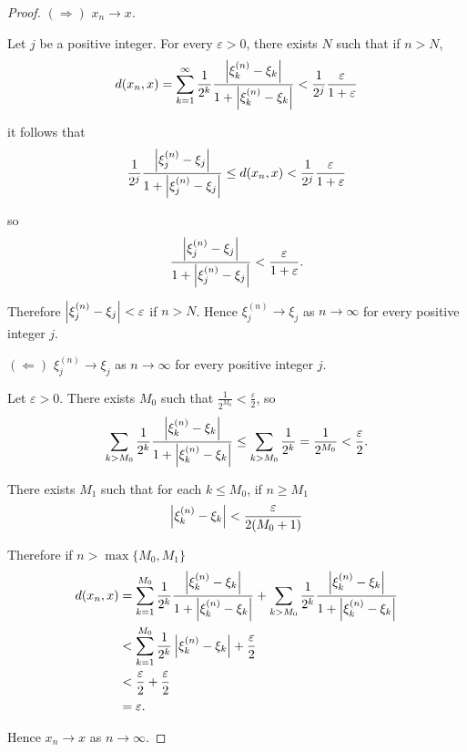 \begin{proof}
    $(\Rightarrow)$ $x_{n}\to x$.

    Let $j$ be a positive integer. For every $\varepsilon > 0$, there exists $N$ such that if $n > N$,
    \[
        d(x_{n}, x) = \sum^{\infty}_{k=1}\frac{1}{2^{k}}\frac{\left\vert{\xi^{(n)}_{k} - \xi_{k}}\right\vert}{1 + \left\vert{\xi^{(n)}_{k} - \xi_{k}}\right\vert} < \frac{1}{2^{j}}\frac{\varepsilon}{1+\varepsilon}
    \]

    it follows that
    \[
        \frac{1}{2^{j}}\frac{\left\vert{\xi^{(n)}_{j} - \xi_{j}}\right\vert}{1 + \left\vert{\xi^{(n)}_{j} - \xi_{j}}\right\vert} \leq d(x_{n}, x) < \frac{1}{2^{j}}\frac{\varepsilon}{1 + \varepsilon}
    \]

    so
    \[
        \frac{\left\vert{\xi^{(n)}_{j} - \xi_{j}}\right\vert}{1 + \left\vert{\xi^{(n)}_{j} - \xi_{j}}\right\vert} < \frac{\varepsilon}{1 + \varepsilon}.
    \]

    Therefore $\left\vert{\xi^{(n)}_{j} - \xi_{j}}\right\vert < \varepsilon$ if $n > N$. Hence $\xi^{(n)}_{j}\to \xi_{j}$ as $n\to\infty$ for every positive integer $j$.

    $(\Leftarrow)$ $\xi_{j}^{(n)}\to \xi_{j}$ as $n\to\infty$ for every positive integer $j$.

    Let $\varepsilon > 0$. There exists $M_{0}$ such that $\frac{1}{2^{M_{0}}} < \frac{\varepsilon}{2}$, so
    \[
        \sum_{k > M_{0}}\frac{1}{2^{k}}\frac{\left\vert{\xi^{(n)}_{k} - \xi_{k}}\right\vert}{1 + \left\vert{\xi^{(n)}_{k} - \xi_{k}}\right\vert} \leq \sum_{k > M_{0}}\frac{1}{2^{k}} = \frac{1}{2^{M_{0}}} < \frac{\varepsilon}{2}.
    \]

    There exists $M_{1}$ such that for each $k\leq M_{0}$, if $n\geq M_{1}$
    \[
        \left\vert{\xi^{(n)}_{k} - \xi_{k}}\right\vert < \frac{\varepsilon}{2(M_{0} + 1)}
    \]

    Therefore if $n > \max\{ M_{0}, M_{1} \}$
    \begin{align*}
        d(x_{n}, x) & = \sum^{M_{0}}_{k=1}\frac{1}{2^{k}}\frac{\left\vert{\xi^{(n)}_{k} - \xi_{k}}\right\vert}{1 + \left\vert{\xi^{(n)}_{k} - \xi_{k}}\right\vert} + \sum_{k > M_{0}}\frac{1}{2^{k}}\frac{\left\vert{\xi^{(n)}_{k} - \xi_{k}}\right\vert}{1 + \left\vert{\xi^{(n)}_{k} - \xi_{k}}\right\vert} \\
                    & < \sum^{M_{0}}_{k=1}\frac{1}{2^{k}}\left\vert{\xi^{(n)}_{k} - \xi_{k}}\right\vert + \frac{\varepsilon}{2}                                                                                                                            \\
                    & < \frac{\varepsilon}{2} + \frac{\varepsilon}{2}                                                                                                                                                                     \\
                    & = \varepsilon.
    \end{align*}

    Hence $x_{n}\to x$ as $n\to\infty$.
\end{proof}


